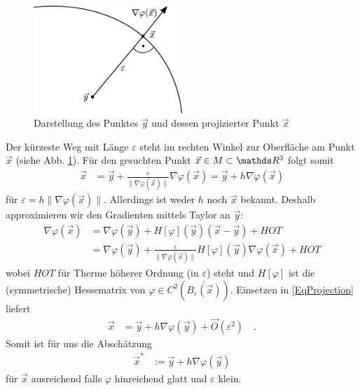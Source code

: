       \begin{figure}
        \centering
        \includegraphics[width=0.5\textwidth]{bilder/projection/projection.eps}
        \caption[Projektion]{Darstellung des Punktes \( \vec{y} \) und dessen projizierter Punkt \( \vec{x} \)}
        \label{AbbProjection}
      \end{figure}
      Der kürzeste Weg mit Länge \( \varepsilon \) steht im rechten Winkel zur Oberfläche am Punkt \( \vec{x} \) (siehe Abb. \ref{AbbProjection}).
      Für den gesuchten Punkt \( \vec{x}\in M \subset \R^{3} \) folgt somit
      \begin{align}
        \vec{x} &= \vec{y} + \frac{\varepsilon}{\|\nabla\varphi(\vec{x})\|} \nabla\varphi(\vec{x})
                = \vec{y} + h \nabla\varphi(\vec{x}) \label{EqProjection}
      \end{align}
      für \( \varepsilon = h \|\nabla\varphi(\vec{x})\| \).
      Allerdings ist weder \( h \) noch \( \vec{x} \) bekannt. 
      Deshalb approximieren wir den Gradienten mittels Taylor an \( \vec{y} \):
      \begin{align}
        \nabla\varphi(\vec{x}) &= \nabla\varphi(\vec{y}) + H[\varphi](\vec{y})(\vec{x}-\vec{y}) + HOT \\
                               &= \nabla\varphi(\vec{y}) + \frac{\varepsilon}{\|\nabla\varphi(\vec{x})\|} H[\varphi](\vec{y})\nabla\varphi(\vec{x}) + HOT
      \end{align}
      wobei  \( HOT \) für Therme höherer Ordnung (in \( \varepsilon \)) steht 
      und \( H[\varphi] \) ist die (symmetrische) Hessematrix von \( \varphi \in
      C^{2}\left(\overline{B_{\varepsilon}(\vec{x})}\right) \).
      Einsetzen in \eqref{EqProjection} liefert
      \begin{align}
        \vec{x} &= \vec{y} +  h \nabla\varphi(\vec{y}) + \vec{O}(\varepsilon^{2}) \quad\text{.}
      \end{align}
      Somit ist für uns die Abschätzung 
      \begin{align}
        \vec{x}^{*} &:= \vec{y} +  h \nabla\varphi(\vec{y})
      \end{align}
      für \( \vec{x} \) ausreichend falls \( \varphi \) hinreichend glatt und \( \varepsilon \) klein.

